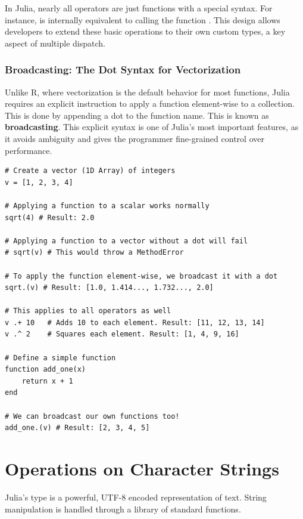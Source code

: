 \begin{remark}
In Julia, nearly all operators are just functions with a special syntax. For instance,  is internally equivalent to calling the function . This design allows developers to extend these basic operations to their own custom types, a key aspect of multiple dispatch.
\end{remark}

\subsubsection*{Broadcasting: The Dot Syntax for Vectorization}
Unlike R, where vectorization is the default behavior for most functions, Julia requires an explicit instruction to apply a function element-wise to a collection. This is done by appending a dot  to the function name. This is known as \textbf{broadcasting}. This explicit syntax is one of Julia's most important features, as it avoids ambiguity and gives the programmer fine-grained control over performance.

\begin{example}
\text{ }\begin{verbatim}
# Create a vector (1D Array) of integers
v = [1, 2, 3, 4]

# Applying a function to a scalar works normally
sqrt(4) # Result: 2.0

# Applying a function to a vector without a dot will fail
# sqrt(v) # This would throw a MethodError

# To apply the function element-wise, we broadcast it with a dot
sqrt.(v) # Result: [1.0, 1.414..., 1.732..., 2.0]

# This applies to all operators as well
v .+ 10   # Adds 10 to each element. Result: [11, 12, 13, 14]
v .^ 2    # Squares each element. Result: [1, 4, 9, 16]

# Define a simple function
function add_one(x)
    return x + 1
end

# We can broadcast our own functions too!
add_one.(v) # Result: [2, 3, 4, 5]
\end{verbatim}
\end{example}

\section{Operations on Character Strings}
\label{sec:julia_string_ops}
Julia's  type is a powerful, UTF-8 encoded representation of text. String manipulation is handled through a library of standard functions.

